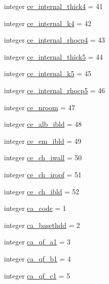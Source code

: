 \begin{DoxyCompactItemize}
integer \hyperlink{namespacecolnamesinputfiles_a865378b6c8d636ee64e56ad2234ab0c4}{ce\+\_\+internal\+\_\+thick4} = 41
\item 
integer \hyperlink{namespacecolnamesinputfiles_a77b6ef5e92eaabd3d4218a8de201302c}{ce\+\_\+internal\+\_\+k4} = 42
\item 
integer \hyperlink{namespacecolnamesinputfiles_aa4d07e2c01fd5991a4502bd448d98050}{ce\+\_\+internal\+\_\+rhocp4} = 43
\item 
integer \hyperlink{namespacecolnamesinputfiles_a9b26465fd0e44d505eeba2967606804b}{ce\+\_\+internal\+\_\+thick5} = 44
\item 
integer \hyperlink{namespacecolnamesinputfiles_a448515ea207dd758aae53bd3b8b7604e}{ce\+\_\+internal\+\_\+k5} = 45
\item 
integer \hyperlink{namespacecolnamesinputfiles_a57e4661a3ca89751e4161e0add0fd701}{ce\+\_\+internal\+\_\+rhocp5} = 46
\item 
integer \hyperlink{namespacecolnamesinputfiles_a31500220a4a78b3e50e91b013569210a}{ce\+\_\+nroom} = 47
\item 
integer \hyperlink{namespacecolnamesinputfiles_ac99323dfe4f8220ceeeb6b4ef688912f}{ce\+\_\+alb\+\_\+ibld} = 48
\item 
integer \hyperlink{namespacecolnamesinputfiles_a36f00f5d675752bbd02cbd68d7841cb3}{ce\+\_\+em\+\_\+ibld} = 49
\item 
integer \hyperlink{namespacecolnamesinputfiles_a3c2f42c2b37b0bc609433059d9ce61f7}{ce\+\_\+ch\+\_\+iwall} = 50
\item 
integer \hyperlink{namespacecolnamesinputfiles_adc6090c20e009cceb9b732914e8112a3}{ce\+\_\+ch\+\_\+iroof} = 51
\item 
integer \hyperlink{namespacecolnamesinputfiles_aacf87521cff3cfe8225e058d87b8f3b1}{ce\+\_\+ch\+\_\+ibld} = 52
\item 
integer \hyperlink{namespacecolnamesinputfiles_a1a7e8bd4476814a4d4f952d2e1d7675f}{ca\+\_\+code} = 1
\item 
integer \hyperlink{namespacecolnamesinputfiles_ac69ac056fe76740c2ac86d2c55abdfe2}{ca\+\_\+basethdd} = 2
\item 
integer \hyperlink{namespacecolnamesinputfiles_a583d3666cb8c402df5ddac03a9cb3f3b}{ca\+\_\+qf\+\_\+a1} = 3
\item 
integer \hyperlink{namespacecolnamesinputfiles_a60c5a9e124e782290b151fe2c63403c5}{ca\+\_\+qf\+\_\+b1} = 4
\item 
integer \hyperlink{namespacecolnamesinputfiles_a0d5c9b53eab6ffe4cc1e25df034a9069}{ca\+\_\+qf\+\_\+c1} = 5

\end{DoxyCompactItemize}

